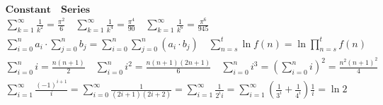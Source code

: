 \documentclass{article}
\begin{document}
\clearpage

\begin{align*}
    \bm{Constant \quad Series} \\  
    \sum_{k=1}^{\infty}{\frac{1}{k^2}} = \frac{\pi^2}{6} \quad \sum_{k=1}^{\infty}{\frac{1}{k^4}} = \frac{\pi^4}{90} \quad \sum_{k=1}^{\infty}{\frac{1}{k^6}} = \frac{\pi^6}{945} \\ 
    \sum_{i=0}^{n}{a_{i}} \cdot \sum_{j=0}^{n}{b_{j}} = \sum_{i=0}^{n}\sum_{j=0}^{n}{(a_{i} \cdot b_{j})} \quad \sum_{n=s}^{t}\ln{f(n)} = \ln{\prod_{n=s}^{t}}f(n) \\ 
    \sum_{i=0}^{n}{i} = \frac{n(n+1)}{2} \quad \sum_{i=0}^{n}{i^2} = \frac{n(n+1)(2n+1)}{6} \quad \sum_{i=0}^{n}{i^3} = (\sum_{i=0}^{n}{i})^2 = \frac{n^2(n+1)^2}{4} \\ 
    \sum_{i=1}^{\infty}{\frac{(-1)^{i+1}}{i}} = \sum_{i=0}^{\infty}{\frac{1}{(2i+1)(2i+2)}} = \sum_{i=1}^{\infty}{\frac{1}{2^i i}} = \sum_{i=1}^{\infty}({\frac{1}{3^i}+\frac{1}{4^i}})\frac{1}{i}= \ln2 \\ 
\end{align*}

\clearpage
\end{document}
